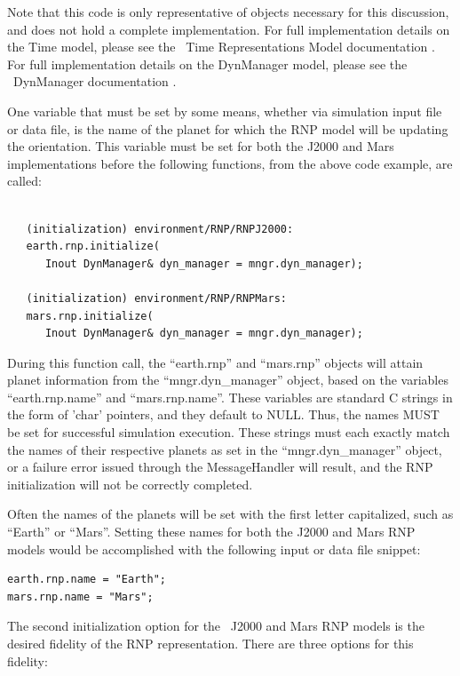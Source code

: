 Note that this code is only representative of objects necessary
for this discussion, and does not hold a complete implementation.
For full implementation details on the Time model, please see
the \JEODid\ Time Representations Model documentation \cite{dynenv:TIME}.
For full implementation details on the DynManager model,
please see the \JEODid\ DynManager documentation
\cite{dynenv:DYNMANAGER}.

One variable that must be set by some means, whether via simulation input
file or data file, is the name of the planet for which the RNP model will be
updating the orientation. This variable must be set for both the J2000 and Mars
implementations before the following functions, from the above code example,
are called:

\begin{verbatim}

   (initialization) environment/RNP/RNPJ2000:
   earth.rnp.initialize(
      Inout DynManager& dyn_manager = mngr.dyn_manager);

   (initialization) environment/RNP/RNPMars:
   mars.rnp.initialize(
      Inout DynManager& dyn_manager = mngr.dyn_manager);

\end{verbatim}

During this function call, the ``earth.rnp'' and ``mars.rnp'' objects will
attain planet information from the \newline ``mngr.dyn\_manager'' object, based
on the variables ``earth.rnp.name'' and ``mars.rnp.name''. These variables are
standard C strings in the form of 'char' pointers, and they default to NULL.
Thus, the names MUST be set for successful simulation execution. These strings
must each exactly match the names of their respective planets as set in the
``mngr.dyn\_manager'' object, or a failure error issued through the
MessageHandler \cite{dynenv:MESSAGE} will result,
and the RNP initialization will not be correctly completed.

Often the names of the planets will be set with the first letter capitalized,
such as ``Earth'' or ``Mars''. Setting these names for both the J2000 and Mars
RNP models would be accomplished with the following input or data file snippet:

\begin{verbatim}
earth.rnp.name = "Earth";
mars.rnp.name = "Mars";
\end{verbatim}               

The second initialization option for the \JEODid\ J2000 and Mars RNP models is
the desired fidelity of the RNP representation. There are three options for this
fidelity:

